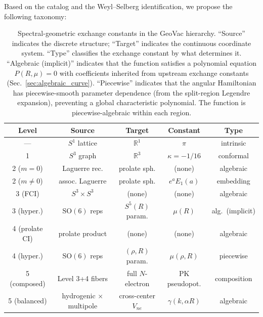 \documentclass[aps,pra,twocolumn,superscriptaddress,longbibliography]{revtex4-2}
\begin{document}
Based on the catalog and the Weyl--Selberg identification, we
propose the following taxonomy:

\begin{table}[h]
\caption{Spectral-geometric exchange constants in the GeoVac
  hierarchy.  ``Source'' indicates the discrete structure;
  ``Target'' indicates the continuous coordinate system.
  ``Type'' classifies the exchange constant by what determines it.
  ``Algebraic (implicit)'' indicates that the function satisfies a
  polynomial equation $P(R,\mu) = 0$ with coefficients inherited from
  upstream exchange constants (Sec.~\ref{sec:algebraic_curve}).
  ``Piecewise'' indicates that the angular Hamiltonian has
  piecewise-smooth parameter dependence (from the split-region
  Legendre expansion), preventing a global characteristic polynomial.
  The function is piecewise-algebraic within each region.}
\label{tab:taxonomy}
\begin{ruledtabular}
\begin{tabular}{ccccc}
  Level & Source & Target & Constant & Type \\
  \hline
  --- & $S^1$ lattice & $\mathbb{R}^1$ & $\pi$ & intrinsic \\
  1 & $S^3$ graph & $\mathbb{R}^3$ & $\kappa = -1/16$ & conformal \\
  2 ($m{=}0$) & Laguerre rec. & prolate sph. & (none) & algebraic \\
  2 ($m{\neq}0$) & assoc. Laguerre & prolate sph. & $e^a E_1(a)$
    & embedding \\
  3 (FCI) & $S^3 {\times} S^3$ & (none) & (none) & algebraic \\
  3 (hyper.) & $\mathrm{SO}(6)$ reps & $S^5(R)$ param.
    & $\mu(R)$ & alg.\ (implicit) \\
  4 (prolate CI) & prolate product & (none) & (none) & algebraic \\
  4 (hyper.) & $\mathrm{SO}(6)$ reps & $(\rho,R)$ param.
    & $\mu(\rho,R)$ & piecewise \\
  5 (composed) & Level 3+4 fibers & full $N$-electron
    & PK pseudopot. & composition \\
  5 (balanced) & hydrogenic $\times$ multipole & cross-center $V_{ne}$
    & $\gamma(k,\alpha R)$ & algebraic \\
\end{tabular}
\end{ruledtabular}
\end{table}
\end{document}
